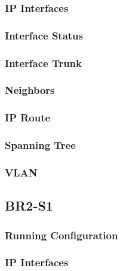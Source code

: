 \subsubsection{IP Interfaces}


\subsubsection{Interface Status}


\subsubsection{Interface Trunk}


\subsubsection{Neighbors}


\subsubsection{IP Route}


\subsubsection{Spanning Tree}


\subsubsection{VLAN}





\subsection{BR2-S1}
\subsubsection{Running Configuration}


\subsubsection{IP Interfaces}


